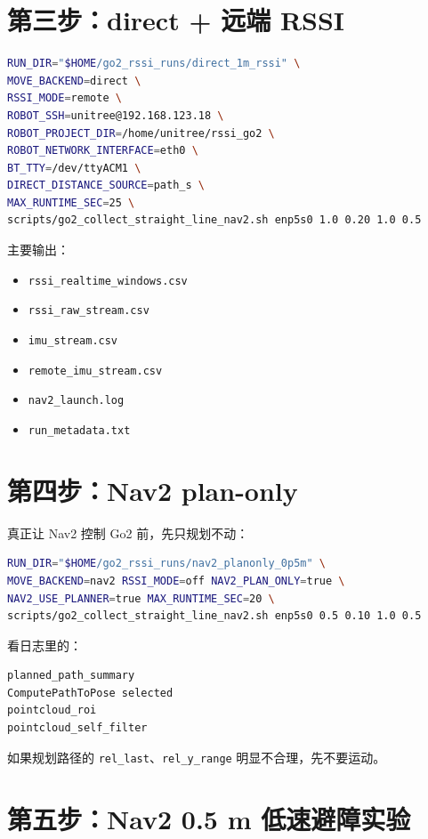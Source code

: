 \documentclass[UTF8,11pt,a4paper,openany]{ctexrep}
\newcommand{\code}[1]{\nolinkurl{#1}}
\newcommand{\file}[1]{\nolinkurl{#1}}
\begin{document}
\section{第三步：direct + 远端 RSSI}

\begin{lstlisting}[language=bash]
RUN_DIR="$HOME/go2_rssi_runs/direct_1m_rssi" \
MOVE_BACKEND=direct \
RSSI_MODE=remote \
ROBOT_SSH=unitree@192.168.123.18 \
ROBOT_PROJECT_DIR=/home/unitree/rssi_go2 \
ROBOT_NETWORK_INTERFACE=eth0 \
BT_TTY=/dev/ttyACM1 \
DIRECT_DISTANCE_SOURCE=path_s \
MAX_RUNTIME_SEC=25 \
scripts/go2_collect_straight_line_nav2.sh enp5s0 1.0 0.20 1.0 0.5
\end{lstlisting}

主要输出：

\begin{itemize}
  \item \file{rssi_realtime_windows.csv}
  \item \file{rssi_raw_stream.csv}
  \item \file{imu_stream.csv}
  \item \file{remote_imu_stream.csv}
  \item \file{nav2_launch.log}
  \item \file{run_metadata.txt}
\end{itemize}

\section{第四步：Nav2 plan-only}

真正让 Nav2 控制 Go2 前，先只规划不动：

\begin{lstlisting}[language=bash]
RUN_DIR="$HOME/go2_rssi_runs/nav2_planonly_0p5m" \
MOVE_BACKEND=nav2 RSSI_MODE=off NAV2_PLAN_ONLY=true \
NAV2_USE_PLANNER=true MAX_RUNTIME_SEC=20 \
scripts/go2_collect_straight_line_nav2.sh enp5s0 0.5 0.10 1.0 0.5
\end{lstlisting}

看日志里的：

\begin{lstlisting}
planned_path_summary
ComputePathToPose selected
pointcloud_roi
pointcloud_self_filter
\end{lstlisting}

如果规划路径的 \code{rel_last}、\code{rel_y_range} 明显不合理，先不要运动。

\section{第五步：Nav2 0.5 m 低速避障实验}
\end{document}
